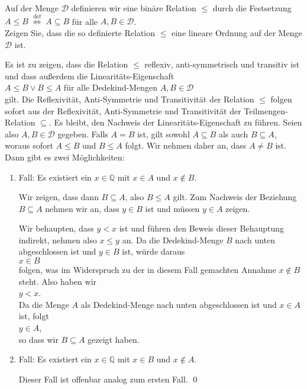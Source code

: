 \exercise
Auf der Menge $\mathcal{D}$ definieren wir eine binäre Relation $\leq$ durch die Festsetzung
\\[0.2cm]
\hspace*{1.3cm}
$A \leq B \;\stackrel{\mathrm{def}}{\Longleftrightarrow}\; A \subseteq B$ \quad für alle $A,B \in \mathcal{D}$.
\\[0.2cm]
Zeigen Sie, dass die so definierte Relation $\leq$ eine lineare Ordnung auf der Menge $\mathcal{D}$ ist.


\solution
Es ist zu zeigen, dass die Relation $\leq$ reflexiv, anti-symmetrisch und transitiv ist und dass außerdem die Linearitäts-Eigenschaft
\\[0.2cm]
\hspace*{1.3cm} $A \leq B \vee B \leq A$ \quad für alle Dedekind-Mengen $A,B \in \mathcal{D}$
\\[0.2cm]
gilt.  Die Reflexivität, Anti-Symmetrie und Transitivität der Relation $\leq$ folgen sofort aus der Reflexivität,
Anti-Symmetrie und Transitivität der Teilmengen-Relation $\subseteq$.  Es bleibt, den Nachweis der
Linearitäts-Eigenschaft zu führen.  Seien also $A,B \in \mathcal{D}$ gegeben.  Falls $A = B$ ist, gilt sowohl
$A \subseteq B$ als auch $B \subseteq A$, woraus sofort $A \leq B$ und $B \leq A$ folgt.  Wir nehmen
daher an, dass $A \not= B$ ist.  Dann gibt es zwei Möglichkeiten:
\begin{enumerate}
\item Fall: Es existiert ein $x \in \mathbb{Q}$ mit $x \in A$ und $x \not\in B$.

            Wir zeigen, dass dann $B \subseteq A$, also $B \leq A$ gilt.  Zum Nachweis der Beziehung
            $B \subseteq A$ nehmen wir an, dass $y \in B$ ist und müssen $y \in A$ zeigen.

            Wir behaupten, dass $y < x$ ist und führen den Beweis dieser Behauptung indirekt, nehmen also
            $x \leq y$ an.  Da die Dedekind-Menge $B$ nach unten abgeschlossen ist und $y \in B$ ist, würde daraus
            \\[0.2cm]
            \hspace*{1.3cm}
            $x \in B$
            \\[0.2cm]
            folgen, was im Widerspruch zu der in diesem Fall gemachten Annahme $x \not\in B$ steht.  Also
            haben wir
            \\[0.2cm]
            \hspace*{1.3cm}
            $y < x$.
            \\[0.2cm]
            Da die Menge $A$ als Dedekind-Menge nach unten abgeschlossen ist und $x \in A$ ist, folgt
            \\[0.2cm]
            \hspace*{1.3cm}
            $y \in A$,
            \\[0.2cm]
            so dass wir $B \subseteq A$ gezeigt haben.
\item Fall: Es existiert ein $x \in \mathbb{Q}$ mit $x \in B$ und $x \not\in A$.

            Dieser Fall ist offenbar analog zum ersten Fall.
            \qed
\end{enumerate}


